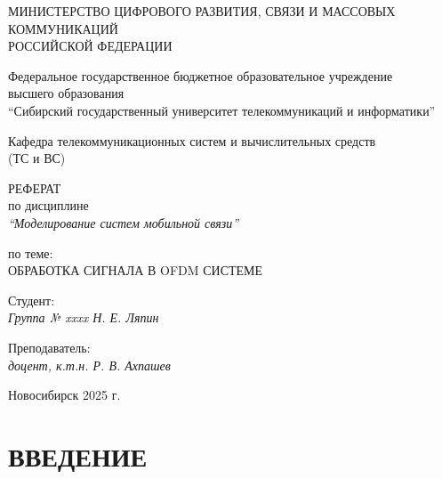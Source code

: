 \documentclass[a4paper,14pt,oneside,openany]{memoir}
\begin{document}
	
	\thispagestyle{empty}
	
	\begin{center}
		МИНИСТЕРСТВО ЦИФРОВОГО РАЗВИТИЯ, СВЯЗИ И МАССОВЫХ КОММУНИКАЦИЙ \\ РОССИЙСКОЙ ФЕДЕРАЦИИ
		
		\vspace{20pt}
		
		Федеральное государственное бюджетное образовательное учреждение  \\  высшего образования \\
		``Сибирский государственный университет телекоммуникаций и информатики'' \\
		
		\vspace{20pt}
		
		Кафедра телекоммуникационных систем и вычислительных средств \\  (ТС и ВС)
	\end{center}
	
	\vfill
	
	\begin{center}
		РЕФЕРАТ \\  
		по дисциплине \\
		\textit{``Моделирование систем мобильной связи''}
		
		\vspace{20pt}
		
		по теме: \\
		\uppercase{Обработка сигнала в OFDM системе}
	\end{center}
	
	\vfill
	
	\noindent Студент: \\
	\textit{Группа № xxxx \hfill Н. Е. Ляпин}
	
	\vspace{20pt}
	
	\noindent Преподаватель: \\
	\textit{доцент, к.т.н. \hfill Р. В. Ахпашев}
	
	\vfill
	
	\begin{center}
		Новосибирск 2025 г.
	\end{center}
	
	\newpage
	\setcounter{page}{2}
	\OnehalfSpacing*
	
	\tableofcontents*
	
	\chapter*{ВВЕДЕНИЕ}
	
\end{document}
